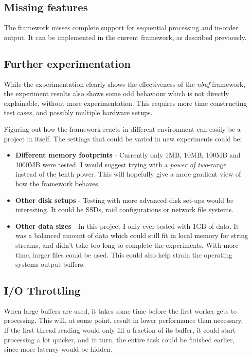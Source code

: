 \documentclass[a4paper]{article}
\newcommand{\nbuf}{\textit{nbuf} }
\begin{document}
\subsection{Missing features}
The framework misses complete support for sequential processing and in-order output. It can be implemented in the current framework, as described previously.


\subsection{Further experimentation}
While the experimentation clearly shows the effectiveness of the \nbuf framework, the experiment results also shows some odd behaviour which is not directly explainable, without more experimentation. This requires more time constructing test cases, and possibly multiple hardware setups.

Figuring out how the framework reacts in different environment can easily be a project in itself. The settings that could be varied in new experiments could be;

\begin{itemize}
\item \textbf{Different memory footprints} - Currently only 1MB, 10MB, 100MB and 1000MB were tested. I would suggest trying with a \textit{power of two}-range instead of the tenth power. This will hopefully give a more gradient view of how the framework behaves.
\item \textbf{Other disk setups} - Testing with more advanced disk set-ups would be interesting. It could be SSDs, raid configurations or network file systems.
\item \textbf{Other data sizes} - In this project I only ever tested with 1GB of data. It was a balanced amount of data which could still fit in local memory for string streams, and didn't take too long to complete the experiments. With more time, larger files could be used. This could also help strain the operating systems output buffers.
\end{itemize}


\subsection{I/O Throttling}
When large buffers are used, it takes some time before the first worker gets to processing. This will, at some point, result in lower performance than necessary. If the first thread reading would only fill a fraction of its buffer, it could start processing a lot quicker, and in turn, the entire task could be finished earlier, since more latency would be hidden.\\
\end{document}
